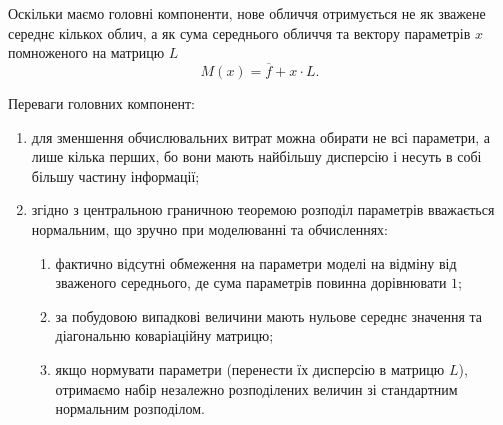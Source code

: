 Оскільки маємо головні компоненти,
нове обличчя отримується не як зважене середнє кількох облич,
а як сума середнього обличчя та вектору параметрів $x$
помноженого на матрицю $L$
\begin{equation*}
  M\left( x \right) = \overline{f} + x \cdot L.
\end{equation*}

Переваги головних компонент:
\begin{enumerate}
  \item для зменшення обчислювальних витрат можна обирати не всі параметри,
    а лише кілька перших,
    бо вони мають найбільшу дисперсію
    і несуть в собі більшу частину інформації;
  \item згідно з центральною граничною теоремою
    розподіл параметрів вважається нормальним,
      що зручно при моделюванні та обчисленнях:
  \begin{enumerate}
    \item фактично відсутні обмеження на параметри моделі на відміну від
      зваженого середнього, де сума параметрів повинна дорівнювати $1$;
    \item за побудовою випадкові величини мають нульове середнє значення
      та діагональню коваріаційну матрицю;
    \item якщо нормувати параметри (перенести їх дисперсію в матрицю $L$),
      отримаємо набір незалежно розподілених величин
      зі стандартним нормальним розподілом.
  \end{enumerate}
\end{enumerate}
